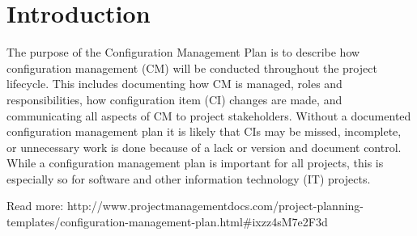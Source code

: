 \chapter{Introduction}
The purpose of the Configuration Management Plan is to describe how configuration management (CM) will be conducted throughout the project lifecycle. This includes documenting how CM is managed, roles and responsibilities, how configuration item (CI) changes are made, and communicating all aspects of CM to project stakeholders. Without a documented configuration management plan it is likely that CIs may be missed, incomplete, or unnecessary work is done because of a lack or version and document control. While a configuration management plan is important for all projects, this is especially so for software and other information technology (IT) projects.

Read more: http://www.projectmanagementdocs.com/project-planning-templates/configuration-management-plan.html#ixzz4sM7e2F3d


